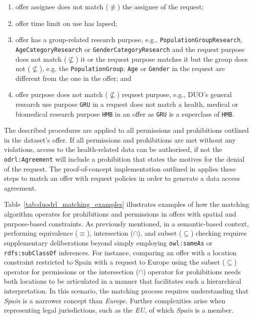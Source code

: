 \begin{enumerate}
    \item offer assignee does not match ($\not\equiv$) the assignee of the request; 
    \item offer time limit on use has lapsed;
    \item offer has a group-related research purpose, e.g., \texttt{PopulationGroupResearch}, \texttt{AgeCategoryResearch} or \texttt{GenderCategoryResearch} and the request purpose does not match ($\not\subseteq$) it or the request purpose matches it but the group does not ($\not\subseteq$), e.g. the \texttt{PopulationGroup}, \texttt{Age} or \texttt{Gender} in the request are different from the one in the offer; and
    \item offer purpose does not match ($\not\subseteq$) request purpose, e.g., DUO's general research use purpose \texttt{GRU} in a request does not match a health, medical or biomedical research purpose \texttt{HMB} in an offer as \texttt{GRU} is a superclass of \texttt{HMB}.
\end{enumerate}

The described procedures are applied to all permissions and prohibitions outlined in the dataset's offer.
If all permissions and prohibitions are met without any violations, access to the health-related data can be authorised, if not the \texttt{odrl:Agreement} will include a prohibition that states the motives for the denial of the request.
The proof-of-concept implementation outlined in  applies these steps to match an offer with request policies in order to generate a data access agreement.

Table~\ref{tab:duodrl_matching_examples} illustrates examples of how the matching algorithm operates for prohibitions and permissions in offers with spatial and purpose-based constraints.
As previously mentioned, in a semantic-based context, performing equivalence ($\equiv$), intersection ($\cap$), and subset ($\subseteq$) checking requires supplementary deliberations beyond simply employing \texttt{owl:sameAs} or \texttt{rdfs:subClassOf} inferences.
For instance, comparing an offer with a location constraint restricted to Spain with a request to Europe using the subset ($\subseteq$) operator for permissions or the intersection ($\cap$) operator for prohibitions needs both locations to be articulated in a manner that facilitates such a hierarchical interpretation.
In this scenario, the matching process requires understanding that \textit{Spain} is a narrower concept than \textit{Europe}.
Further complexities arise when representing legal jurisdictions, such as the \textit{EU}, of which \textit{Spain} is a member.

